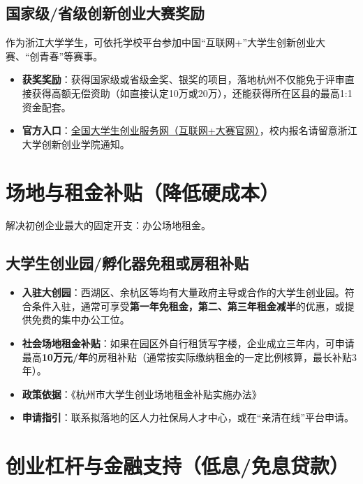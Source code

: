 \documentclass[a4paper, 12pt]{ctexart}
\begin{document}
\subsection{国家级/省级创新创业大赛奖励}
作为浙江大学学生，可依托学校平台参加中国“互联网+”大学生创新创业大赛、“创青春”等赛事。
\begin{itemize}
    \item \textbf{获奖奖励}：获得国家级或省级金奖、银奖的项目，落地杭州不仅能免于评审直接获得高额无偿资助（如直接认定10万或20万），还能获得所在区县的最高1:1资金配套。
    \item \textbf{官方入口}：\href{https://cy.ncss.cn/}{全国大学生创业服务网（互联网+大赛官网）}，校内报名请留意浙江大学创新创业学院通知。
\end{itemize}

\section{场地与租金补贴（降低硬成本）}
解决初创企业最大的固定开支：办公场地租金。

\subsection{大学生创业园/孵化器免租或房租补贴}
\begin{itemize}
    \item \textbf{入驻大创园}：西湖区、余杭区等均有大量政府主导或合作的大学生创业园。符合条件入驻，通常可享受\textbf{第一年免租金，第二、第三年租金减半}的优惠，或提供免费的集中办公工位。
    \item \textbf{社会场地租金补贴}：如果在园区外自行租赁写字楼，企业成立三年内，可申请最高\textbf{10万元/年}的房租补贴（通常按实际缴纳租金的一定比例核算，最长补贴3年）。
    \item \textbf{政策依据}：《杭州市大学生创业场地租金补贴实施办法》
    \item \textbf{申请指引}：联系拟落地的区人力社保局人才中心，或在“亲清在线”平台申请。
\end{itemize}

\section{创业杠杆与金融支持（低息/免息贷款）}
\end{document}
